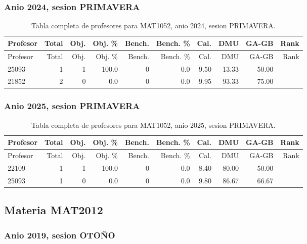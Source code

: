 \subsubsection{Anio 2024, sesion PRIMAVERA}

\begingroup
\scriptsize
\setlength{\tabcolsep}{3pt}
\begin{longtable}{lrrrrrrrrr}
\caption{Tabla completa de profesores para MAT1052, anio 2024, sesion PRIMAVERA.}\label{tab:prof-period-mat1052-2024-primavera}\\
\toprule
Profesor & Total & Obj. & Obj. \% & Bench. & Bench. \% & Cal. & DMU & GA-GB & Rank \\
\midrule
\endfirsthead
\toprule
Profesor & Total & Obj. & Obj. \% & Bench. & Bench. \% & Cal. & DMU & GA-GB & Rank \\
\midrule
\endhead
25093 & 1 & 1 & 100.0 & 0 & 0.0 & 9.50 & 13.33 & 50.00 &  \\
21852 & 2 & 0 & 0.0 & 0 & 0.0 & 9.95 & 93.33 & 75.00 &  \\
\bottomrule
\end{longtable}
\endgroup

\subsubsection{Anio 2025, sesion PRIMAVERA}

\begingroup
\scriptsize
\setlength{\tabcolsep}{3pt}
\begin{longtable}{lrrrrrrrrr}
\caption{Tabla completa de profesores para MAT1052, anio 2025, sesion PRIMAVERA.}\label{tab:prof-period-mat1052-2025-primavera}\\
\toprule
Profesor & Total & Obj. & Obj. \% & Bench. & Bench. \% & Cal. & DMU & GA-GB & Rank \\
\midrule
\endfirsthead
\toprule
Profesor & Total & Obj. & Obj. \% & Bench. & Bench. \% & Cal. & DMU & GA-GB & Rank \\
\midrule
\endhead
22109 & 1 & 1 & 100.0 & 0 & 0.0 & 8.40 & 80.00 & 50.00 &  \\
25093 & 1 & 0 & 0.0 & 0 & 0.0 & 9.80 & 86.67 & 66.67 &  \\
\bottomrule
\end{longtable}
\endgroup

\subsection{Materia MAT2012}

\subsubsection{Anio 2019, sesion OTOÑO}

